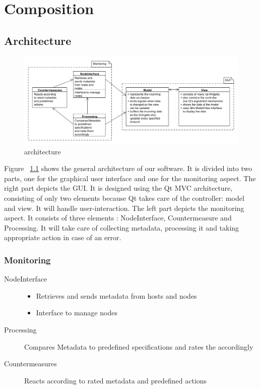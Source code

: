 \chapter{Composition}

\section{Architecture}

\begin{figure}[here]
\includegraphics[width=\linewidth]{./bilder/architektur.png}
\caption{architecture}
\label{fig:architecture}
\end{figure}

Figure ~\ref{fig:architecture} shows the general architecture of our software. It is divided into two parts, one for the graphical user interface and one for the monitoring aspect.
The right part depicts the GUI. It is designed using the Qt MVC architecture, consisting of only two elements because Qt takes care of the controller: model and view. It will handle user-interaction.
The left part depicts the monitoring aspect. It consists of three elements : NodeInterface, Countermeasure and Processing. It will take care of collecting metadata, processing it and taking appropriate action in case of an error.

\subsection{Monitoring}

\begin{description}
	\item[NodeInterface] \mbox{}
		\begin{itemize}
			\item Retrieves and sends metadata from hosts and nodes
			\item Interface to manage nodes
		\end{itemize}
	\item[Processing] \mbox{} 
	Compares Metadata to predefined specifications and
	rates the accordingly
	\item[Countermeasures] \mbox{} 
	Reacts according to rated metadata and
	predefined actions
\end{description}

